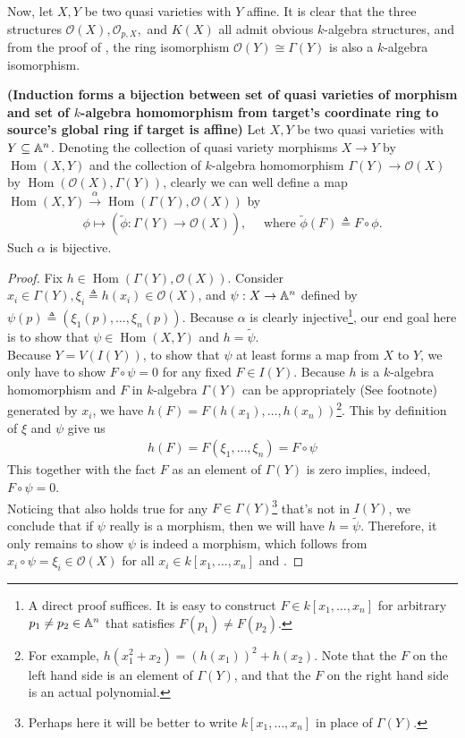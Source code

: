 \documentclass{report}
\begin{document}
Now, let $X,Y$ be two quasi varieties  with $Y$ affine. It is clear that the three structures $\mathscr{O}(X),\mathscr{O}_{p,X},$ and $K(X)$ all admit obvious $k$-algebra structures, and from the proof of , the ring isomorphism $\mathscr{O}(Y)\cong \Gamma (Y)$ is also a $k$-algebra isomorphism.
\begin{theorem}
\textbf{(Induction forms a bijection between set of quasi varieties of morphism and set of $k$-algebra homomorphism from target's coordinate ring to source's global ring if target is affine)} Let $X,Y$ be two quasi varieties  with $Y\subseteq \mathbb{A}^n$. Denoting the collection of quasi variety morphisms $X \rightarrow Y$ by $\operatorname{Hom}(X,Y)$ and the collection of  $k$-algebra homomorphism $\Gamma (Y)\rightarrow \mathscr{O}(X)$ by $\operatorname{Hom}(\mathscr{O}(X),\Gamma (Y))$, clearly we can well define a map  $\operatorname{Hom}(X,Y)\xrightarrow{\alpha }  \operatorname{Hom}(\Gamma (Y),\mathscr{O}(X))$ by 
\begin{align*}
\phi \mapsto  (\tilde{\phi}:\Gamma (Y)\rightarrow \mathscr{O}(X)),\quad \text{ where }\tilde{\phi} (F)\triangleq  F \circ \phi. 
\end{align*}
Such $\alpha $ is bijective. 
\end{theorem}
\begin{proof}
Fix $h\in \operatorname{Hom}(\Gamma (Y),\mathscr{O}(X))$. Consider $x_i \in \Gamma (Y),\xi_i\triangleq h(x_i) \in \mathscr{O}(X)$, and $\psi: X\rightarrow \mathbb{A}^n$ defined by $\psi(p)\triangleq (\xi_1(p),\dots ,\xi_n(p))$. Because $\alpha $ is clearly injective\footnote{A direct proof suffices. It is easy to construct $F \in k[x_1,\dots ,x_n]$ for arbitrary $p_1 \neq p_2 \in \mathbb{A}^n$ that satisfies $F(p_1)\neq F(p_2)$.}, our end goal here is to show that $\psi \in \operatorname{Hom}(X,Y)$ and $h= \tilde{\psi}$. \\

Because $Y=V(I(Y))$, to show that $\psi$ at least forms a map from $X$ to $Y$, we only have to show  $F\circ \psi=0 $ for any fixed $F \in I(Y)$. Because $h$ is a $k$-algebra homomorphism and  $F$ in $k$-algebra  $\Gamma (Y)$ can be appropriately (See footnote) generated by $x_i$, we have $h(F)=F(h(x_1),\dots ,h(x_n))$\footnote{For example, $h(x_1^2+x_2)=(h(x_1))^2+h(x_2)$. Note that the $F$ on the left hand side is an element of $\Gamma (Y)$, and that the $F$ on the right hand side is an actual polynomial.}. This by definition of $\xi$ and $\psi$ give us
\begin{align}
\label{hFF}
h(F)=F(\xi_1,\dots ,\xi_n)= F \circ \psi
\end{align}
This together with the fact  $F$ as an element of $\Gamma (Y)$ is zero implies, indeed, $F \circ \psi=0$. \\

Noticing that  also holds true for any $F \in \Gamma (Y)$\footnote{Perhaps here it will be better to write $ k[x_1,\dots ,x_n]$ in place of $\Gamma (Y)$.} that's not in $I(Y)$, we conclude that if $\psi$ really is a morphism, then we will have $h=\tilde{\psi}$. Therefore, it only remains to show $\psi$ is indeed a morphism, which follows from $x_i \circ \psi = \xi_i \in \mathscr{O}(X)$ for all $x_i \in k[x_1,\dots ,x_n]$ and .
\end{proof}
\end{document}
